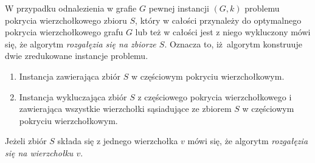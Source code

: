 {\begin{bproof}
  \end{bproof}
  \begin{definition}
    W przypadku odnalezienia w grafie $G$ pewnej instancji $(G, k)$ problemu pokrycia wierzchołkowego zbioru $S$, który w całości przynależy do optymalnego pokrycia wierzchołkowego grafu $G$ lub też w całości jest z niego wykluczony mówi się, że algorytm \emph{rozgałęzia się na zbiorze $S$}.
    Oznacza to, iż algorytm konstruuje dwie zredukowane instancje problemu.
    \begin{enumerate}
      \item Instancja zawierająca zbiór $S$ w częściowym pokryciu wierzchołkowym.
      \item Instancja wykluczająca zbiór $S$ z częściowego pokrycia wierzchołkowego i zawierająca wszystkie wierzchołki sąsiadujące ze zbiorem $S$ w częściowym pokryciu wierzchołkowym.
    \end{enumerate}
    Jeżeli zbiór $S$ składa się z jednego wierzchołka $v$ mówi się, że algorytm \emph{rozgałęzia się na wierzchołku $v$}.
  \end{definition}
}

